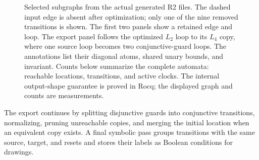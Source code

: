 \documentclass{ieeeaccess}
\begin{document}
\begin{figure}[t]
\centering

\caption{Selected subgraphs from the actual generated R2 files. The dashed input edge is absent after optimization; only one of the nine removed transitions is shown. The first two panels show a retained edge and loop. The export panel follows the optimized $L_2$ loop to its $L_4$ copy, where one source loop becomes two conjunctive-guard loops. The annotations list their diagonal atoms, shared unary bounds, and invariant. Counts below summarize the complete automata: reachable locations, transitions, and active clocks. The internal output-shape guarantee is proved in Rocq; the displayed graph and counts are measurements.}
\label{fig:R2-generated}
\end{figure}

The export continues by splitting disjunctive guards into conjunctive transitions, normalizing, pruning unreachable copies, and merging the initial location when an equivalent copy exists. A final symbolic pass groups transitions with the same source, target, and resets and stores their labels as Boolean conditions for drawings.
\end{document}
